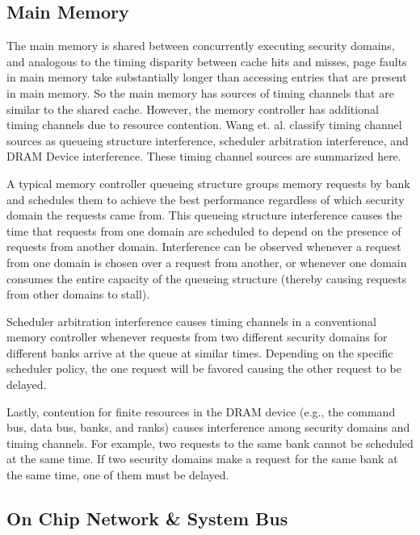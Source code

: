 \subsection{Main Memory}
The main memory is shared between concurrently executing security domains, and 
analogous to the timing disparity between cache hits and misses, page faults in 
main memory take substantially longer than accessing entries that are present 
in main memory. So the main memory has sources of timing channels that are 
similar to the shared cache. However, the memory controller has additional 
timing channels due to resource contention. Wang et. al. classify timing 
channel sources as queueing structure interference, scheduler arbitration 
interference, and DRAM Device interference. These timing channel sources are 
summarized here.

A typical memory controller queueing structure groups memory requests by bank 
and schedules them to achieve the best performance regardless of which security 
domain the requests came from. This queueing structure interference causes the 
time that requests from one domain are scheduled to depend on the presence of 
requests from another domain. Interference can be observed whenever a request 
from one domain is chosen over a request from another, or whenever one domain 
consumes the entire capacity of the queueing structure (thereby causing 
requests from other domains to stall).

Scheduler arbitration interference causes timing channels in a conventional 
memory controller whenever requests from two different security domains for 
different banks arrive at the queue at similar times. Depending on the specific 
scheduler policy, the one request will be favored causing the other request to 
be delayed.

Lastly, contention for finite resources in the DRAM device (e.g., the command 
bus, data bus, banks, and ranks) causes interference among security domains and 
timing channels. For example, two requests to the same bank cannot be scheduled 
at the same time. If two security domains make a request for the same bank at 
the same time, one of them must be delayed.

\subsection{On Chip Network \& System Bus}
